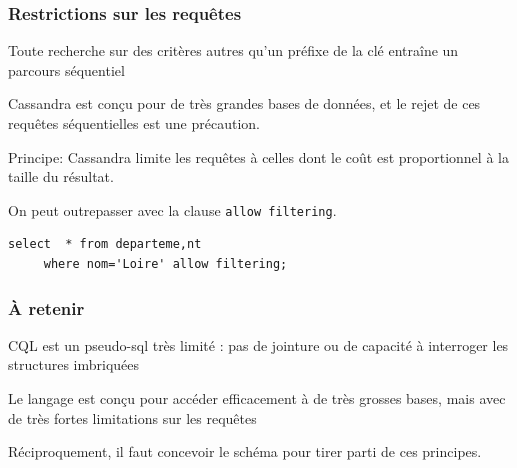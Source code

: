 \begin{frame}[fragile] \frametitle{Restrictions sur les requêtes}

Toute recherche sur des critères autres qu'un préfixe de la clé entraîne un parcours
séquentiel

\vfill

Cassandra est conçu pour de très grandes bases de données, et le rejet 
de ces requêtes séquentielles est une précaution. 

\vfill

Principe: Cassandra limite les requêtes à celles dont le coût est proportionnel à la 
taille du résultat.

\vfill

On peut outrepasser avec la clause \texttt{allow filtering}.
\begin{verbatim}
select  * from departeme,nt 
     where nom='Loire' allow filtering;
\end{verbatim}


\end{frame}



\begin{frame}[fragile]
\frametitle{À retenir}

\begin{redbullet}
   \item CQL est un pseudo-sql très limité : pas de jointure ou de capacité
       à interroger les structures imbriquées
   \item Le langage est conçu  pour accéder \alert{efficacement} à de très grosses
      bases, mais avec de très fortes limitations sur les requêtes
   \item Réciproquement, il faut concevoir le schéma pour tirer parti
   de ces principes.
\end{redbullet}
\end{frame}
